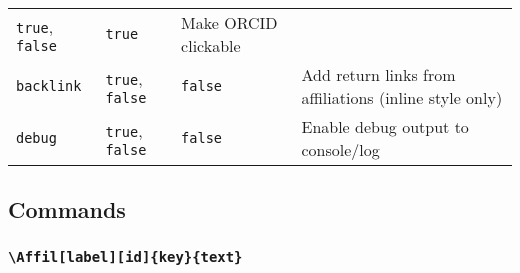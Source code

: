 \documentclass[
]{article}
\begin{document}
\begin{longtable}[]{@{}llll@{}}
\begin{minipage}[t]{0.19\columnwidth}
\texttt{true}, \texttt{false}\strut
\end{minipage} & \begin{minipage}[t]{0.21\columnwidth}\raggedright
\texttt{true}\strut
\end{minipage} & \begin{minipage}[t]{0.30\columnwidth}\raggedright
Make ORCID clickable\strut
\end{minipage}\tabularnewline
\begin{minipage}[t]{0.19\columnwidth}\raggedright
\texttt{backlink}\strut
\end{minipage} & \begin{minipage}[t]{0.19\columnwidth}\raggedright
\texttt{true}, \texttt{false}\strut
\end{minipage} & \begin{minipage}[t]{0.21\columnwidth}\raggedright
\texttt{false}\strut
\end{minipage} & \begin{minipage}[t]{0.30\columnwidth}\raggedright
Add return links from affiliations (inline style only)\strut
\end{minipage}\tabularnewline
\begin{minipage}[t]{0.19\columnwidth}\raggedright
\texttt{debug}\strut
\end{minipage} & \begin{minipage}[t]{0.19\columnwidth}\raggedright
\texttt{true}, \texttt{false}\strut
\end{minipage} & \begin{minipage}[t]{0.21\columnwidth}\raggedright
\texttt{false}\strut
\end{minipage} & \begin{minipage}[t]{0.30\columnwidth}\raggedright
Enable debug output to console/log\strut
\end{minipage}\tabularnewline
\bottomrule
\end{longtable}

\hypertarget{commands}{%
\subsection{Commands}\label{commands}}

\hypertarget{affillabelidkeytext}{%
\subsubsection{\texorpdfstring{\texttt{\textbackslash{}Affil{[}label{]}{[}id{]}\{key\}\{text\}}}{\textbackslash Affil{[}label{]}{[}id{]}\{key\}\{text\}}}\label{affillabelidkeytext}}
\end{document}

